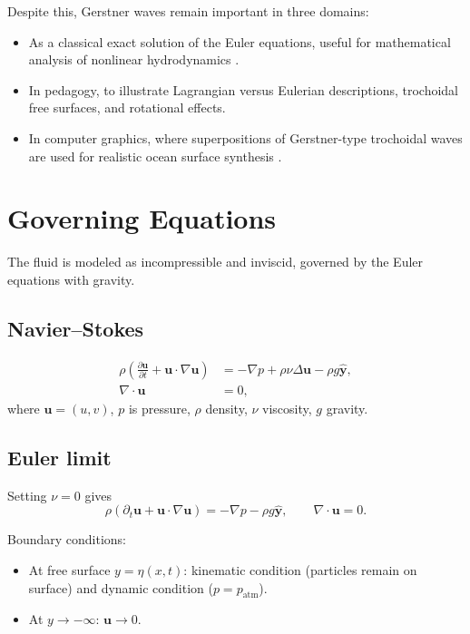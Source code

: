 \documentclass[11pt]{article}
\begin{document}
Despite this, Gerstner waves remain important in three domains:
\begin{itemize}
    \item As a classical exact solution of the Euler equations, useful for mathematical analysis of nonlinear hydrodynamics \cite{craik2004origins,constantin2001gerstner}.
    \item In pedagogy, to illustrate Lagrangian versus Eulerian descriptions, trochoidal free surfaces, and rotational effects.
    \item In computer graphics, where superpositions of Gerstner-type trochoidal waves are used for realistic ocean surface synthesis \cite{tessendorf2001simulating}.
\end{itemize}

\section{Governing Equations}
The fluid is modeled as incompressible and inviscid, governed by the Euler equations with gravity.

\subsection{Navier--Stokes}
\begin{align}
\rho \left( \frac{\partial \mathbf{u}}{\partial t} + \mathbf{u}\cdot\nabla\mathbf{u} \right) 
 &= - \nabla p + \rho \nu \Delta \mathbf{u} - \rho g \hat{\mathbf{y}}, \\
\nabla\cdot \mathbf{u} &= 0,
\end{align}
where $\mathbf{u}=(u,v)$, $p$ is pressure, $\rho$ density, $\nu$ viscosity, $g$ gravity.

\subsection{Euler limit}
Setting $\nu=0$ gives
\begin{equation}
\rho \left( \partial_t \mathbf{u} + \mathbf{u}\cdot\nabla\mathbf{u} \right) = - \nabla p - \rho g \hat{\mathbf{y}}, 
\qquad \nabla \cdot \mathbf{u} = 0.
\end{equation}

Boundary conditions:
\begin{itemize}
\item At free surface $y=\eta(x,t)$: kinematic condition (particles remain on surface) and dynamic condition ($p=p_{\mathrm{atm}}$).
\item At $y\to -\infty$: $\mathbf{u}\to 0$.
\end{itemize}
\end{document}
